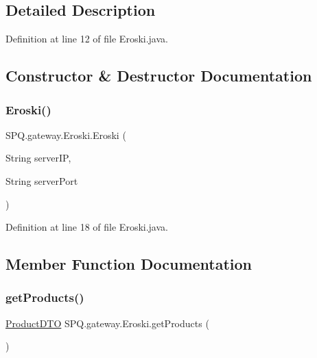 \subsection{Detailed Description}


Definition at line 12 of file Eroski.\+java.



\subsection{Constructor \& Destructor Documentation}
\mbox{\label{class_s_p_q_1_1gateway_1_1_eroski_a3cc7f464fb202689cf62501ffb5ede18}} 
\subsubsection{\texorpdfstring{Eroski()}{Eroski()}}
{\footnotesize\ttfamily S\+P\+Q.\+gateway.\+Eroski.\+Eroski (\begin{DoxyParamCaption}\item[{String}]{server\+IP,  }\item[{String}]{server\+Port }\end{DoxyParamCaption})}



Definition at line 18 of file Eroski.\+java.



\subsection{Member Function Documentation}
\mbox{\label{class_s_p_q_1_1gateway_1_1_eroski_acfd174565206c16fb55489786957b8de}} 
\subsubsection{\texorpdfstring{get\+Products()}{getProducts()}}
{\footnotesize\ttfamily \mbox{\hyperlink{class_s_p_q_1_1dto_1_1_product_d_t_o}{Product\+D\+TO}} S\+P\+Q.\+gateway.\+Eroski.\+get\+Products (\begin{DoxyParamCaption}{ }\end{DoxyParamCaption})}



